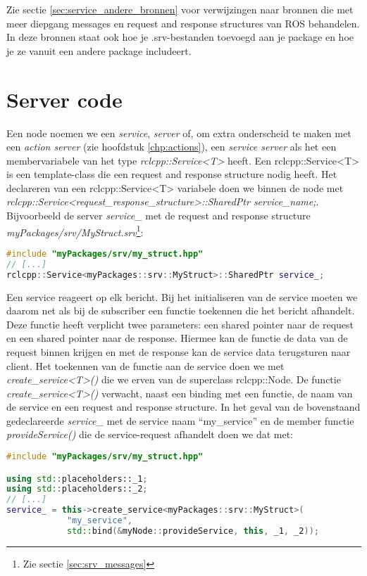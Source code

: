 Zie sectie \ref{sec:service_andere_bronnen} voor verwijzingen naar bronnen die met meer diepgang messages en request and response structures van ROS behandelen. In deze bronnen staat ook hoe je .srv-bestanden toevoegd aan je package en hoe je ze vanuit een andere package includeert.

\section{Server code}
Een node noemen we een \textit{service}, \textit{server} of, om extra onderscheid te maken met een \textit{action server} (zie hoofdstuk \ref{chp:actions}), een \textit{service server} als het een membervariabele van het type \textit{rclcpp::Service<T>} heeft. Een rclcpp::Service<T> is een template-class die een request and response structure nodig heeft. Het declareren van een rclcpp::Service<T> variabele doen we binnen de node met \textit{rclcpp::Service<request\_response\_structure>::SharedPtr service\_name;}. Bijvoorbeeld de server \textit{service\_} met de request and response structure \textit{myPackages/srv/MyStruct.srv}\footnote{Zie sectie \ref{sec:srv_messages}}:
\begin{lstlisting}[language=C++, caption={Een voorbeeld van het declareren van een service server.}, firstnumber=0, label={}]
#include "myPackages/srv/my_struct.hpp"
// [...]
rclcpp::Service<myPackages::srv::MyStruct>::SharedPtr service_;
\end{lstlisting}

Een service reageert op elk bericht. Bij het initialiseren van de service moeten we daarom net als bij de subscriber een functie toekennen die het bericht afhandelt. Deze functie heeft verplicht twee parameters: een shared pointer naar de request en een shared pointer naar de response. Hiermee kan de functie de data van de request binnen krijgen en met de response kan de service data terugsturen naar client. Het toekennen van de functie aan de service doen we met \textit{create\_service<T>()} die we erven van de superclass rclcpp::Node. De functie \textit{create\_service<T>()} verwacht, naast een binding met een functie, de naam van de service en een request and response structure. In het geval van de bovenstaand gedeclareerde \textit{service\_} met de service naam ``my\_service'' en de member functie \textit{provideService()} die de service-request afhandelt doen we dat met:

\begin{lstlisting}[language=C++, caption={Het initialiseren van een service server. Meestal gebeurt dit in de constructor.}, firstnumber=0, label={}]
#include "myPackages/srv/my_struct.hpp"

using std::placeholders::_1;
using std::placeholders::_2;
// [...]
service_ = this->create_service<myPackages::srv::MyStruct>(
            "my_service", 
            std::bind(&myNode::provideService, this, _1, _2));
\end{lstlisting}

